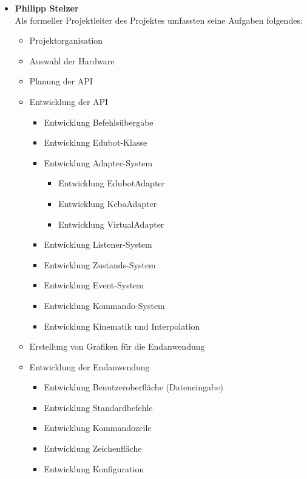 \begin{itemize}

\item \textbf{Philipp Stelzer}\\
Als formeller Projektleiter des Projektes umfassten seine Aufgaben folgendes:
\begin{itemize}
\item Projektorganisation
\item Auswahl der Hardware
\item Planung der API
\item Entwicklung der API
\begin{itemize}
\item Entwicklung Befehlsübergabe
\item Entwicklung Edubot-Klasse
\item Entwicklung Adapter-System
\begin{itemize}
\item Entwicklung EdubotAdapter
\item Entwicklung KebaAdapter
\item Entwicklung VirtualAdapter
\end{itemize}
\item Entwicklung Listener-System
\item Entwicklung Zustands-System
\item Entwicklung Event-System
\item Entwicklung Kommando-System
\item Entwicklung Kinematik und Interpolation
\end{itemize}
\item Erstellung von Grafiken für die Endanwendung
\item Entwicklung der Endanwendung
\begin{itemize}
\item Entwicklung Benutzeroberfläche (Dateneingabe)
\item Entwicklung Standardbefehle
\item Entwicklung Kommandozeile
\item Entwicklung Zeichenfläche
\item Entwicklung Konfiguration
\end{itemize}
\end{itemize}


\end{itemize}
